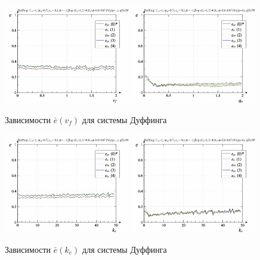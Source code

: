 \begin{figure}[ht!]
\begin{center}
  \includegraphics[width=0.49\textwidth]{p/cha/duff/duff_id-p_v_f_sign.png}
  \hfill
  \includegraphics[width=0.49\textwidth]{p/cha/duff/duff_id-p_q_gamma_sin.png}
\end{center}
  \caption{Зависимости $\bar{e}(v_f)$ для системы Дуффинга}
\label{atu:f:duff_e_v_f}
\end{figure}

\begin{figure}[ht!]
\begin{center}
  \includegraphics[width=0.49\textwidth]{p/cha/duff/duff_id-p_k_e_sign.png}
  \hfill
  \includegraphics[width=0.49\textwidth]{p/cha/duff/duff_id-p_k_e_sin.png}
\end{center}
  \caption{Зависимости $\bar{e}(k_e)$ для системы Дуффинга}
\label{atu:f:duff_e_k_e}
\end{figure}

